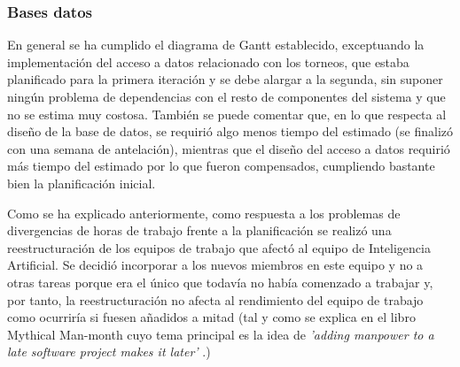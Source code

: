 \subsubsection*{Bases datos}
En general se ha cumplido el diagrama de Gantt establecido, exceptuando la implementación del acceso a datos relacionado con los torneos, que estaba planificado para la primera iteración y se debe alargar a la segunda, sin suponer ningún problema de dependencias con el resto de componentes del sistema y que no se estima muy costosa. También se puede comentar que, en lo que respecta al diseño de la base de datos, se requirió algo menos tiempo del estimado (se finalizó con una semana de antelación), mientras que el diseño del acceso a datos requirió más tiempo del estimado por lo que fueron compensados, cumpliendo bastante bien la planificación inicial.

Como se ha explicado anteriormente, como respuesta a los problemas de divergencias de horas de trabajo frente a la planificación se realizó una reestructuración de los equipos de trabajo que afectó al equipo de Inteligencia Artificial. Se decidió incorporar a los nuevos miembros en este equipo y no a otras tareas porque era el único que todavía no había comenzado a trabajar y, por tanto, la reestructuración no afecta al rendimiento del equipo de trabajo como ocurriría si fuesen añadidos a mitad (tal y como se explica en el libro Mythical Man-month cuyo tema principal es la idea de \textit{'adding manpower to a late software project makes it later'} \cite{libroMMM}.)
